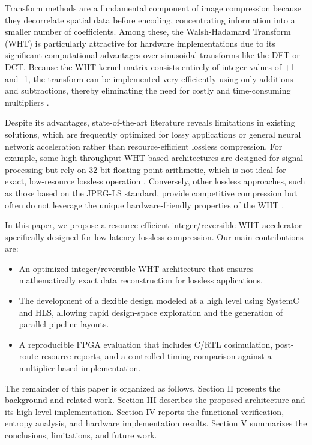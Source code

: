 \documentclass[conference]{IEEEtran}
\begin{document}
Transform methods are a fundamental component of image compression because they decorrelate spatial data before encoding, concentrating information into a smaller number of coefficients. Among these, the Walsh-Hadamard Transform (WHT) is particularly attractive for hardware implementations due to its significant computational advantages over sinusoidal transforms like the DFT or DCT. Because the WHT kernel matrix consists entirely of integer values of +1 and -1, the transform can be implemented very efficiently using only additions and subtractions, thereby eliminating the need for costly and time-consuming multipliers \cite{manjarres2021,hafizullah2018}.

Despite its advantages, state-of-the-art literature reveals limitations in existing solutions, which are frequently optimized for lossy applications or general neural network acceleration rather than resource-efficient lossless compression. For example, some high-throughput WHT-based architectures are designed for signal processing but rely on 32-bit floating-point arithmetic, which is not ideal for exact, low-resource lossless operation \cite{manjarres2021}. Conversely, other lossless approaches, such as those based on the JPEG-LS standard, provide competitive compression but often do not leverage the unique hardware-friendly properties of the WHT \cite{alonso2021}.

In this paper, we propose a resource-efficient integer/reversible WHT accelerator specifically designed for low-latency lossless compression. Our main contributions are:
\begin{itemize}
    \item An optimized integer/reversible WHT architecture that ensures mathematically exact data reconstruction for lossless applications.
    \item The development of a flexible design modeled at a high level using SystemC and HLS, allowing rapid design-space exploration and the generation of parallel-pipeline layouts.
    \item A reproducible FPGA evaluation that includes C/RTL cosimulation, post-route resource reports, and a controlled timing comparison against a multiplier-based implementation.
\end{itemize}

The remainder of this paper is organized as follows. Section II presents the background and related work. Section III describes the proposed architecture and its high-level implementation. Section IV reports the functional verification, entropy analysis, and hardware implementation results. Section V summarizes the conclusions, limitations, and future work.
\end{document}

